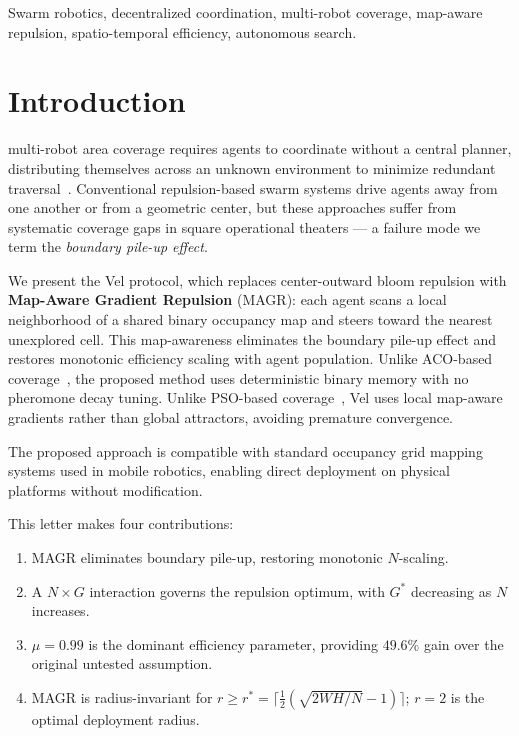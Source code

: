 \documentclass[journal,twoside,letterpaper]{IEEEtran}
\begin{document}
\begin{IEEEkeywords}
Swarm robotics, decentralized coordination, multi-robot coverage,
map-aware repulsion, spatio-temporal efficiency, autonomous search.
\end{IEEEkeywords}

\section{Introduction}

 multi-robot area coverage requires agents to
coordinate without a central planner, distributing themselves across an unknown
environment to minimize redundant traversal~\cite{brambilla2013,galceran2013}.
Conventional repulsion-based swarm systems drive agents away from one another
or from a geometric center, but these approaches suffer from systematic coverage
gaps in square operational theaters — a failure mode we term the
\textit{boundary pile-up effect}.

We present the Vel protocol, which replaces center-outward bloom repulsion
with \textbf{Map-Aware Gradient Repulsion} (MAGR): each agent scans a local
neighborhood of a shared binary occupancy map and steers toward the nearest
unexplored cell. This map-awareness eliminates the boundary pile-up effect and
restores monotonic efficiency scaling with agent population. Unlike ACO-based coverage~\cite{dorigo1996}, 
the proposed method uses deterministic binary memory with no
pheromone decay tuning. Unlike PSO-based coverage~\cite{kennedy1995}, Vel uses
local map-aware gradients rather than global attractors, avoiding premature
convergence.

The proposed approach is compatible with standard occupancy grid mapping systems used in mobile robotics, 
enabling direct deployment on physical platforms without modification.

This letter makes four contributions:
\begin{enumerate}
    \item MAGR eliminates boundary pile-up, restoring monotonic $N$-scaling.
    \item A $N \times G$ interaction governs the repulsion optimum, with $G^*$
          decreasing as $N$ increases.
    \item $\mu = 0.99$ is the dominant efficiency parameter, providing $49.6\%$
          gain over the original untested assumption.
    \item MAGR is radius-invariant for $r \geq r^* = \lceil\frac{1}{2}
          (\sqrt{2WH/N}-1)\rceil$; $r=2$ is the optimal deployment radius.
\end{enumerate}
\end{document}
